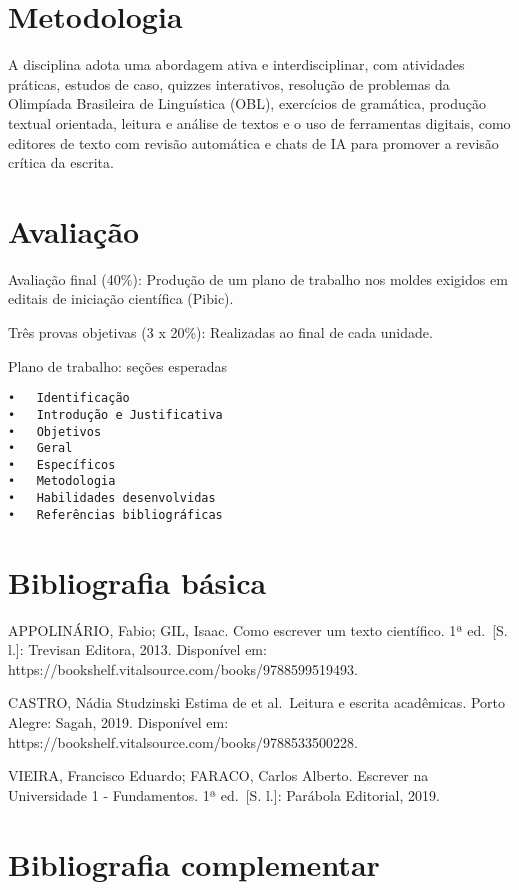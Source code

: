 \documentclass[
  letterpaper,
  DIV=11,
  numbers=noendperiod]{scrreprt}
\begin{document}
\section{Metodologia}\label{metodologia}

A disciplina adota uma abordagem ativa e interdisciplinar, com
atividades práticas, estudos de caso, quizzes interativos, resolução de
problemas da Olimpíada Brasileira de Linguística (OBL), exercícios de
gramática, produção textual orientada, leitura e análise de textos e o
uso de ferramentas digitais, como editores de texto com revisão
automática e chats de IA para promover a revisão crítica da escrita.

\section{Avaliação}\label{avaliauxe7uxe3o}

Avaliação final (40\%): Produção de um plano de trabalho nos moldes
exigidos em editais de iniciação científica (Pibic).

Três provas objetivas (3 x 20\%): Realizadas ao final de cada unidade.

Plano de trabalho: seções esperadas

\begin{verbatim}
•   Identificação
•   Introdução e Justificativa
•   Objetivos
•   Geral
•   Específicos
•   Metodologia
•   Habilidades desenvolvidas
•   Referências bibliográficas
\end{verbatim}

\section{Bibliografia básica}\label{bibliografia-buxe1sica}

APPOLINÁRIO, Fabio; GIL, Isaac. Como escrever um texto científico. 1ª
ed.~{[}S. l.{]}: Trevisan Editora, 2013. Disponível em:
https://bookshelf.vitalsource.com/books/9788599519493.

CASTRO, Nádia Studzinski Estima de et al.~Leitura e escrita acadêmicas.
Porto Alegre: Sagah, 2019. Disponível em:
https://bookshelf.vitalsource.com/books/9788533500228.

VIEIRA, Francisco Eduardo; FARACO, Carlos Alberto. Escrever na
Universidade 1 - Fundamentos. 1ª ed.~{[}S. l.{]}: Parábola Editorial,
2019.

\section{Bibliografia complementar}\label{bibliografia-complementar}
\end{document}
